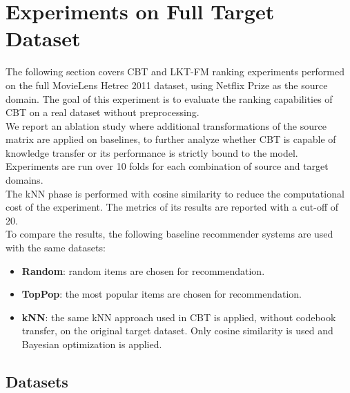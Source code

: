 \chapter{Experiments on Full Target Dataset}
\label{ch:experiments-full}

The following section covers CBT and LKT-FM ranking experiments performed on the full MovieLens Hetrec 2011 dataset, using Netflix Prize as the source domain. The goal of this experiment is to evaluate the ranking capabilities of CBT on a real dataset without preprocessing.\\
We report an ablation study where additional transformations of the source matrix are applied on baselines, to further analyze whether CBT is capable of knowledge transfer or its performance is strictly bound to the model.\\
Experiments are run over 10 folds for each combination of source and target domains.\\
The kNN phase is performed with cosine similarity to reduce the computational cost of the experiment. The metrics of its results are reported with a cut-off of 20.\\
To compare the results, the following baseline recommender systems are used with the same datasets:
\begin{itemize}
\item \textbf{Random}: random items are chosen for recommendation.
\item \textbf{TopPop}: the most popular items are chosen for recommendation.
\item \textbf{kNN}: the same kNN approach used in CBT is applied, without codebook transfer, on the original target dataset. Only cosine similarity is used and Bayesian optimization is applied.
\end{itemize}



\section{Datasets}


